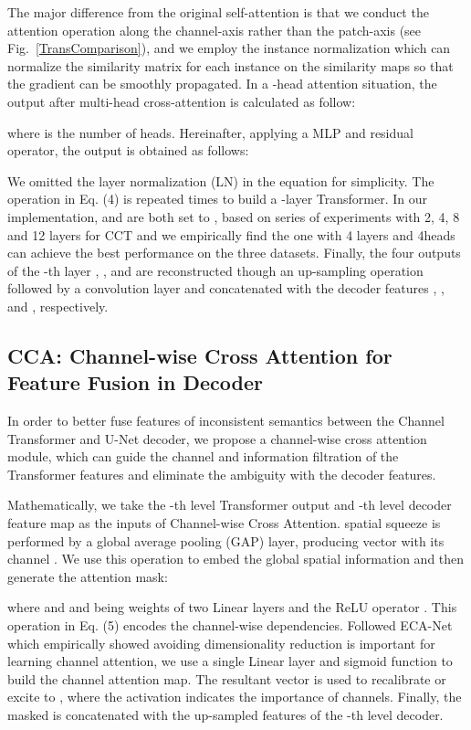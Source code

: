 \documentclass[letterpaper]{article} \usepackage{aaai22}  \usepackage{times}  \usepackage{helvet}  \usepackage{courier}  \usepackage[hyphens]{url}  \usepackage{graphicx} \urlstyle{rm} \def\UrlFont{\rm}  \usepackage{natbib}  \usepackage{caption} \DeclareCaptionStyle{ruled}{labelfont=normalfont,labelsep=colon,strut=off} \frenchspacing  \setlength{\pdfpagewidth}{8.5in}  \setlength{\pdfpageheight}{11in}  \usepackage{algorithm}
\begin{document}
	The major difference from the original self-attention is that we conduct the attention operation along the channel-axis rather than the patch-axis (see Fig.~\ref{TransComparison}), and we employ the instance normalization which can normalize the similarity matrix for each instance on the similarity maps so that the gradient can be smoothly propagated.
	In a -head attention situation, the output after multi-head cross-attention is calculated as follow:
	
	where  is the number of heads. Hereinafter, applying a MLP and residual operator, the output is obtained as follows: 
	
	We omitted the layer normalization (LN) in the equation for simplicity. The operation in Eq. (4) is repeated  times to build a -layer Transformer. In our implementation,  and  are both set to , based on series of experiments with 2, 4, 8 and 12 layers for CCT and we empirically find the one with 4 layers and 4heads can achieve the best performance
	on the three datasets.
	Finally, the four outputs of the -th layer , ,  and  are reconstructed though an up-sampling operation followed by a convolution layer and concatenated with the decoder features , ,  and , respectively.
	
	
	
	
	\subsection{CCA: Channel-wise Cross Attention for Feature Fusion in Decoder}
	In order to better fuse features of inconsistent semantics between the Channel Transformer and U-Net decoder, we propose a channel-wise cross attention module, which can guide the channel and information filtration of the Transformer features and eliminate the ambiguity with the decoder features.
	
	
	Mathematically, we take the -th level Transformer output  and -th level decoder feature map  as the inputs of Channel-wise Cross Attention.
	spatial squeeze is performed by a global average pooling (GAP) layer, producing vector  with its  channel .
	We use this operation to embed the global spatial information and then generate the attention mask:  
	
	where  and  and being weights of two Linear layers and the ReLU operator . 
	This operation in Eq. (5) encodes the channel-wise dependencies. Followed ECA-Net \cite{ECANetEfficientChannel_2020} which empirically showed avoiding dimensionality reduction is important for learning channel attention, we use a single Linear layer and sigmoid function to build the channel attention map. The resultant vector is used to recalibrate or excite  to
	, where the activation  indicates the importance of channels. 
	Finally, the masked  is concatenated with the up-sampled features of the -th level decoder.
	
\end{document}

